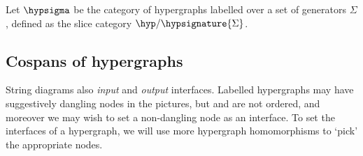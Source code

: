 \begin{definition}
    Let \(\hypsigma\) be the category of hypergraphs labelled over a set of
    generators \(\Sigma\), defined as the slice category
    \(\hyp / \hypsignature{\Sigma}\).
\end{definition}

\subsection{Cospans of hypergraphs}

String diagrams also \emph{input} and \emph{output} interfaces.
Labelled hypergraphs may have suggestively dangling nodes in the pictures,
but and are not ordered, and moreover we may wish to set a non-dangling node
as an interface.
To set the interfaces of a hypergraph, we will use more hypergraph homomorphisms
to `pick' the appropriate nodes.


